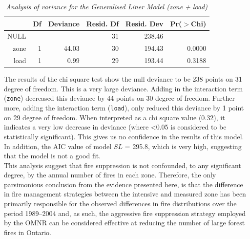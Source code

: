 \begin{spacing}{1.5}
\begin{table}[ht]
\begin{center}
\begin{tabular}{r|rrrrr}
  \hline
 & Df & Deviance & Resid. Df & Resid. Dev & Pr($>$Chi) \\ 
  \hline
NULL &  &  & 31 & 238.46 &  \\ 
  zone & 1 & 44.03 & 30 & 194.43 & 0.0000 \\ 
  load & 1 & 0.99 & 29 & 193.44 & 0.3188 \\ 
   \hline
\end{tabular}
\caption[Analysis of variance for the GLM (zone + load)]{\emph{Analysis of variance for the Generalised Liner Model (zone + load)}}
\label{tab8}
\end{center}
\end{table}
\noindent The results of the chi square test show the null deviance to be 238 points on 31 degree of freedom. This is a very large deviance. Adding in the interaction term (\texttt{zone}) decreased this deviance by 44 points on 30 degree of freedom. Further more, adding the interaction term (\texttt{load}), only reduced this deviance by 1 point on 29 degree of freedom. When interpreted as a chi square value (0.32), it indicates a very low decrease in deviance (where <0.05 is considered to be statistically significant). This gives us no confidence in the results of this model. In addition, the AIC value of model $SL$ = 295.8, which is very high, suggesting that the model is not a good fit. \\

\noindent This analysis suggest that fire suppression is not confounded, to any significant degree, by the annual number of fires in each zone. Therefore, the only parsimonious conclusion from the evidence presented here, is that the difference in fire management strategies between the intensive and measured zone has been primarily responsible for the observed differences in fire distributions over the period 1989--2004 and, as such, the aggressive fire suppression strategy employed by the OMNR can be considered effective at reducing the number of large forest fires in Ontario.

\end{spacing}
\clearpage
